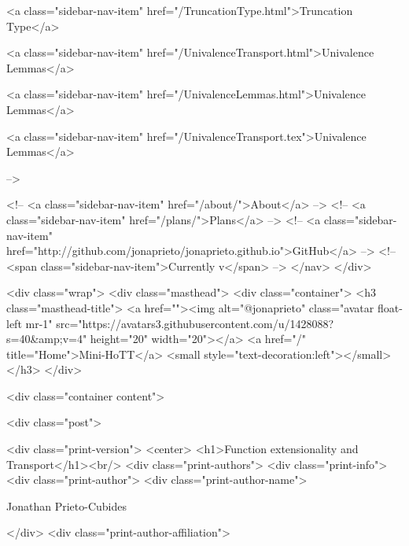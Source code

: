       
    
      
        
          <a class="sidebar-nav-item" href="/TruncationType.html">Truncation Type</a>
        
      
    
      
        
          <a class="sidebar-nav-item" href="/UnivalenceTransport.html">Univalence Lemmas</a>
        
      
    
      
        
          <a class="sidebar-nav-item" href="/UnivalenceLemmas.html">Univalence Lemmas</a>
        
      
    
      
        
          <a class="sidebar-nav-item" href="/UnivalenceTransport.tex">Univalence Lemmas</a>
        
      
     -->

    <!-- <a class="sidebar-nav-item" href="/about/">About</a> -->
    <!-- <a class="sidebar-nav-item" href="/plans/">Plans</a> -->
    <!-- <a class="sidebar-nav-item" href="http://github.com/jonaprieto/jonaprieto.github.io">GitHub</a> -->
    <!-- <span class="sidebar-nav-item">Currently v</span> -->
  </nav>
</div>

    <div class="wrap">
      <div class="masthead">
        <div class="container">
          <h3 class="masthead-title">
            <a href=""><img alt="@jonaprieto" class="avatar float-left mr-1" src="https://avatars3.githubusercontent.com/u/1428088?s=40&amp;v=4" height="20" width="20"></a>
            <a href="/" title="Home">Mini-HoTT</a>
            <small style="text-decoration:left"></small>
          </h3>
        </div>
      
      <div class="container content">
        







<div class="post">

  <div class="print-version">
    <center>
      <h1>Function extensionality and Transport</h1><br/>
        <div class="print-authors">
          <div class="print-info">
            <div class="print-author">
              <div class="print-author-name">
                
                  Jonathan Prieto-Cubides
                
              </div>
              <div class="print-author-affiliation">
                
